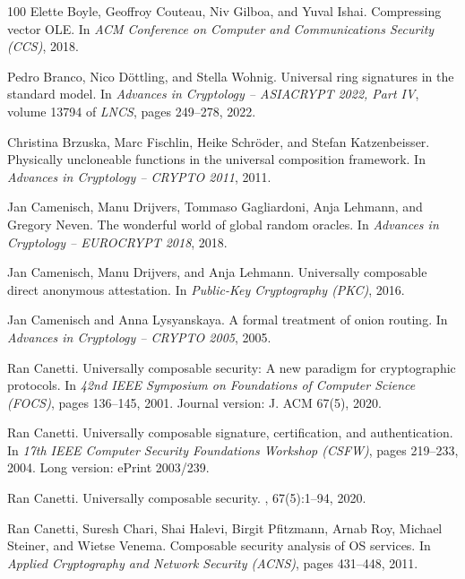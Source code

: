 \documentclass[11pt,a4paper]{article}
\begin{document}
\begin{thebibliography}{100}
Elette Boyle, Geoffroy Couteau, Niv Gilboa, and Yuval Ishai.
\newblock Compressing vector {OLE}.
\newblock In {\em ACM Conference on Computer and Communications Security
  (CCS)}, 2018.

Pedro Branco, Nico D{\"o}ttling, and Stella Wohnig.
\newblock Universal ring signatures in the standard model.
\newblock In {\em Advances in Cryptology -- ASIACRYPT 2022, Part IV}, volume
  13794 of {\em LNCS}, pages 249--278, 2022.

Christina Brzuska, Marc Fischlin, Heike Schr{\"o}der, and Stefan Katzenbeisser.
\newblock Physically uncloneable functions in the universal composition
  framework.
\newblock In {\em Advances in Cryptology -- CRYPTO 2011}, 2011.

Jan Camenisch, Manu Drijvers, Tommaso Gagliardoni, Anja Lehmann, and Gregory
  Neven.
\newblock The wonderful world of global random oracles.
\newblock In {\em Advances in Cryptology -- EUROCRYPT 2018}, 2018.

Jan Camenisch, Manu Drijvers, and Anja Lehmann.
\newblock Universally composable direct anonymous attestation.
\newblock In {\em Public-Key Cryptography (PKC)}, 2016.

Jan Camenisch and Anna Lysyanskaya.
\newblock A formal treatment of onion routing.
\newblock In {\em Advances in Cryptology -- CRYPTO 2005}, 2005.

Ran Canetti.
\newblock Universally composable security: A new paradigm for cryptographic
  protocols.
\newblock In {\em 42nd IEEE Symposium on Foundations of Computer Science
  (FOCS)}, pages 136--145, 2001.
\newblock Journal version: J. ACM 67(5), 2020.

Ran Canetti.
\newblock Universally composable signature, certification, and authentication.
\newblock In {\em 17th IEEE Computer Security Foundations Workshop (CSFW)},
  pages 219--233, 2004.
\newblock Long version: ePrint 2003/239.

Ran Canetti.
\newblock Universally composable security.
, 67(5):1--94, 2020.

Ran Canetti, Suresh Chari, Shai Halevi, Birgit Pfitzmann, Arnab Roy, Michael
  Steiner, and Wietse Venema.
\newblock Composable security analysis of {OS} services.
\newblock In {\em Applied Cryptography and Network Security (ACNS)}, pages
  431--448, 2011.


\end{thebibliography}
\end{document}
